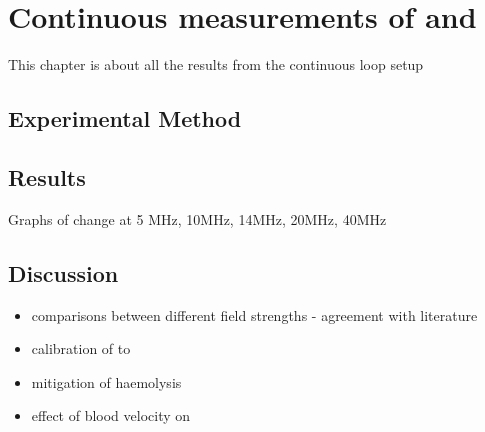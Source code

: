 \chapter{Continuous measurements of \Ttwo and \SOtwo}
\label{ch:cont}

This chapter is about all the results from the continuous loop setup
\section{Experimental Method}
\section{Results}

Graphs of \Ttwo change at 5 MHz, 10MHz, 14MHz, 20MHz, 40MHz

\section{Discussion}
\begin{itemize}
\item comparisons between different field strengths - agreement with literature
\item calibration of \Kzero to \SOtwo
\item mitigation of haemolysis
\item effect of blood velocity on \Ttwo

\end{itemize}
